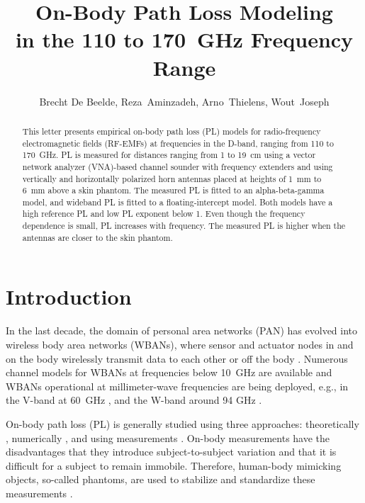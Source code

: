 \documentclass[manuscript]{rsl}
\title{On-Body Path Loss Modeling\\ in the 110 to 170~GHz Frequency Range}
\author{Brecht De Beelde,
Reza~Aminzadeh,
Arno~Thielens,
Wout~Joseph
}
\begin{document}
\maketitle

%
%

\begin{abstract}
This letter presents empirical on-body path loss (PL) models for radio-frequency electromagnetic fields (RF-EMFs) at frequencies in the D-band, ranging from 110 to 170~GHz. 
PL is measured for distances ranging from 1 to 19~cm using a vector network analyzer (VNA)-based channel sounder with frequency extenders and using vertically and horizontally polarized horn antennas placed at heights of 1~mm to 6~mm above a skin phantom.
The measured PL is fitted to an alpha-beta-gamma model, and wideband PL is fitted to a floating-intercept model.
Both models have a high reference PL and low PL exponent below 1. 
Even though the frequency dependence is small, PL increases with frequency. 
The measured PL is higher when the antennas are closer to the skin phantom.
\end{abstract}

\section{Introduction\label{sect:intro}}

In the last decade, the domain of personal area networks (PAN) has evolved into wireless body area networks (WBANs), where sensor and actuator nodes in and on the body wirelessly transmit data to each other \cite{Patel2010} or off the body \cite{Marinova2015}. 
Numerous channel models for WBANs at frequencies below 10~GHz are available \cite{VanRoy2010} and WBANs operational at millimeter-wave frequencies are being deployed, e.g., in the V-band at 60~GHz \cite{Chahat2013,Petrillo2014,Aminzadeh2021_tap}, and the W-band around 94 GHz \cite{Brizzi2013,Ali2022}.

On-body path loss (PL) is generally studied using three approaches: theoretically \cite{Chahat2013,Petrillo2014}, numerically \cite{Reusens2009}, and using measurements \cite{Chahat2013,Reusens2009,Aminzadeh2021_tap}. 
On-body measurements have the disadvantages that they introduce subject-to-subject variation \cite{Proesmans2022} and that it is difficult for a subject to remain immobile. 
Therefore, human-body mimicking objects, so-called phantoms, are used to stabilize and standardize these measurements \cite{Chahat2013}. 
\end{document}
